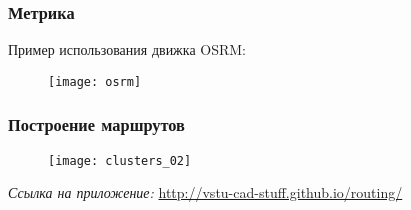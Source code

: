 \begin{frame}
    \frametitle{Метрика}
    Пример использования движка OSRM:
    \begin{figure}
        \center
        \texttt{[image: osrm]}
    \end{figure}
\end{frame}

\begin{frame}
    \frametitle{Построение маршрутов}
    \begin{figure}
        \center
        \texttt{[image: clusters\_02]}
    \end{figure}
    \small\emph{Ссылка на приложение:} \url{http://vstu-cad-stuff.github.io/routing/}
\end{frame}
